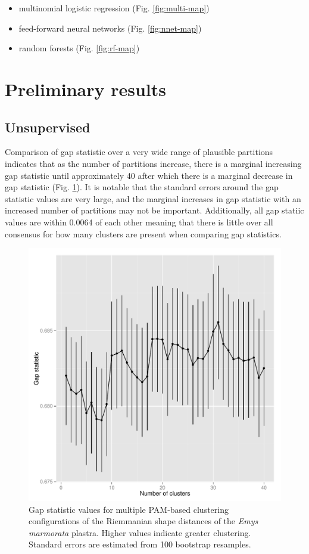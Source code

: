 \documentclass{article}\usepackage{graphicx, color}
\begin{document}
\begin{itemize}
  \item multinomial logistic regression (Fig. \ref{fig:multi-map})
  \item feed-forward neural networks (Fig. \ref{fig:nnet-map})
  \item random forests (Fig. \ref{fig:rf-map})
\end{itemize}


\section{Preliminary results}
\subsection{Unsupervised}
Comparison of gap statistic over a very wide range of plausible partitions indicates that as the number of partitions increase, there is a marginal increasing gap statistic until approximately 40 after which there is a marginal decrease in gap statistic (Fig. \ref{fig:gap}). It is notable that the standard errors around the gap statistic values are very large, and the marginal increases in gap statistic with an increased number of partitions may not be important. Additionally, all gap statiic values are within 0.0064 of each other meaning that there is little over all consensus for how many clusters are present when comparing gap statistics.



\begin{figure}[ht]
  \centering
  \includegraphics[width = \textwidth, keepaspectratio = true]{figure/gap}
  \caption{Gap statistic values for multiple PAM-based clustering configurations of the Riemmanian shape distances of the \textit{Emys marmorata} plastra. Higher values indicate greater clustering. Standard errors are estimated from 100 bootstrap resamples.}
  \label{fig:gap}
\end{figure}
\end{document}
